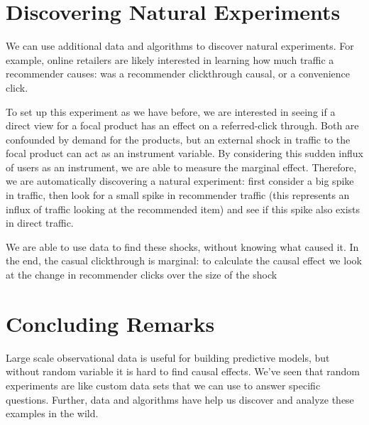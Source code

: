 \section{Discovering Natural Experiments}

We can use additional data and algorithms to discover natural experiments.  For example, online retailers are likely interested in learning how much traffic a recommender causes: was a recommender clickthrough causal, or a convenience click.  

To set up this experiment as we have before, we are interested in seeing if a direct view for a focal product has an effect on a referred-click through.  Both are confounded by demand for the products, but an external shock in traffic to the focal product can act as an instrument variable.  By considering this sudden influx of users as an instrument, we are able to measure the marginal effect.  Therefore, we are automatically discovering a natural experiment: first consider a big spike in traffic, then look for a small spike in recommender traffic (this represents an influx of traffic looking at the recommended item) and see if this spike also exists in direct traffic.  

We are able to use data to find these shocks, without knowing what caused it.  In the end, the casual clickthrough is marginal: to calculate the causal effect we look at the change in recommender clicks over the size of the shock

\section{Concluding Remarks}

Large scale observational data is useful for building predictive models, but without random variable it is hard to find causal effects.  We've seen that random experiments are like custom data sets that we can use to answer specific questions. Further, data and algorithms have help us discover and analyze these examples in the wild.

